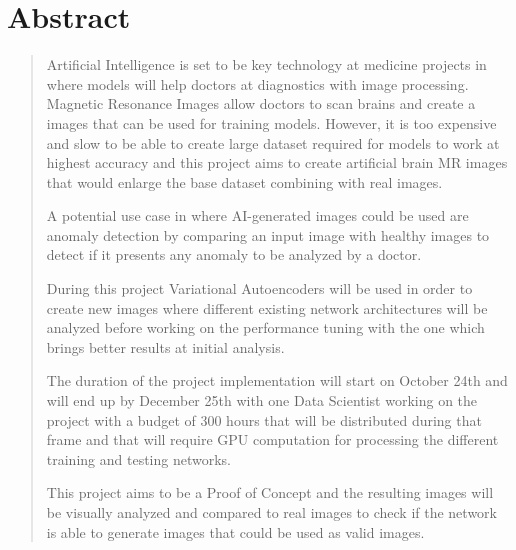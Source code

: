 \documentclass[11pt,a4paper,openany]{book}
\begin{document}
\chapter*{\centering Abstract}
\begin{quote}
    {Artificial Intelligence is set to be key technology at medicine projects in where models will help doctors at diagnostics with image processing. Magnetic Resonance Images allow doctors to scan brains and create a images that can be used for training models. However, it is too expensive and slow to be able to create large dataset required for models to work at highest accuracy and this project aims to create artificial brain MR images that would enlarge the base dataset combining with real images.
    
    A potential use case in where AI-generated images could be used are anomaly detection by comparing an input image with healthy images to detect if it presents any anomaly to be analyzed by a doctor.
    
    During this project Variational Autoencoders will be used in order to create new images where different existing network architectures will be analyzed before working on the performance tuning with the one which brings better results at initial analysis.
    
    The duration of the project implementation will start on October 24th and will end up by December 25th with one Data Scientist working on the project with a budget of 300 hours that will be distributed during that frame and that will require GPU computation for processing the different training and testing networks.
    
    This project aims to be a Proof of Concept and the resulting images will be visually analyzed and compared to real images to check if the network is able to generate images that could be used as valid images.}
\end{quote}

\pagestyle{fancy}
\renewcommand{\chaptermark}[1]{ \markboth{#1}{}}
\renewcommand{\sectionmark}[1]{\markright{ \thesection.\ #1}}
\lhead[\fancyplain{}{\bfseries\thepage}]{\fancyplain{}{\bfseries\rightmark}}
\rhead[\fancyplain{}{\bfseries\leftmark}]{\fancyplain{}{\bfseries\thepage}}
\cfoot{}

\cleardoublepage
{}
{}
\tableofcontents
\cleardoublepage
{}
{}
\listoffigures
\cleardoublepage
{}
{}
\listoftables
\end{document}
